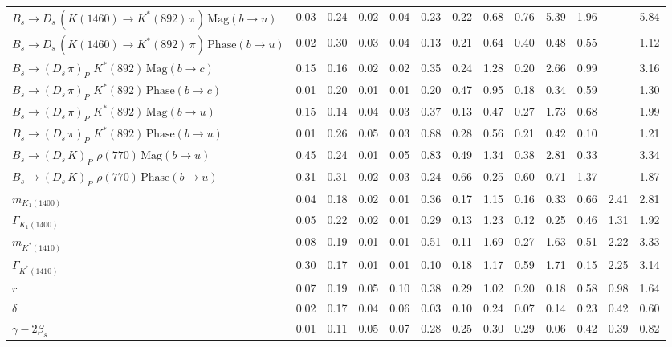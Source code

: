 \begin{tabular}{l  c  c  c  c  c  c  c  c  c  c  c  | c }
$B_s \to D_s \, ( K(1460) \to K^{*}(892) \, \pi ) \, \text{Mag} (b \to u)$ & 0.03 & 0.24 & 0.02 & 0.04 & 0.23 & 0.22 & 0.68 & 0.76 & 5.39 & 1.96 &  & 5.84 \\ 
$B_s \to D_s \, ( K(1460) \to K^{*}(892) \, \pi ) \, \text{Phase} (b \to u)$ & 0.02 & 0.30 & 0.03 & 0.04 & 0.13 & 0.21 & 0.64 & 0.40 & 0.48 & 0.55 &  & 1.12 \\ 
$B_s \to ( D_s \, \pi)_{P} \, \, K^{*}(892) \, \text{Mag} (b \to c)$ & 0.15 & 0.16 & 0.02 & 0.02 & 0.35 & 0.24 & 1.28 & 0.20 & 2.66 & 0.99 &  & 3.16 \\ 
$B_s \to ( D_s \, \pi)_{P} \, \, K^{*}(892) \, \text{Phase} (b \to c)$ & 0.01 & 0.20 & 0.01 & 0.01 & 0.20 & 0.47 & 0.95 & 0.18 & 0.34 & 0.59 &  & 1.30 \\ 
$B_s \to ( D_s \, \pi)_{P} \, \, K^{*}(892) \, \text{Mag} (b \to u)$ & 0.15 & 0.14 & 0.04 & 0.03 & 0.37 & 0.13 & 0.47 & 0.27 & 1.73 & 0.68 &  & 1.99 \\ 
$B_s \to ( D_s \, \pi)_{P} \, \, K^{*}(892) \, \text{Phase} (b \to u)$ & 0.01 & 0.26 & 0.05 & 0.03 & 0.88 & 0.28 & 0.56 & 0.21 & 0.42 & 0.10 &  & 1.21 \\ 
$B_s \to ( D_s \, K)_{P} \, \, \rho(770) \, \text{Mag} (b \to u)$ & 0.45 & 0.24 & 0.01 & 0.05 & 0.83 & 0.49 & 1.34 & 0.38 & 2.81 & 0.33 &  & 3.34 \\ 
$B_s \to ( D_s \, K)_{P} \, \, \rho(770) \, \text{Phase} (b \to u)$ & 0.31 & 0.31 & 0.02 & 0.03 & 0.24 & 0.66 & 0.25 & 0.60 & 0.71 & 1.37 &  & 1.87 \\ 
$m_{K_1(1400)} $ & 0.04 & 0.18 & 0.02 & 0.01 & 0.36 & 0.17 & 1.15 & 0.16 & 0.33 & 0.66 & 2.41 & 2.81 \\ 
$\Gamma_{K_1(1400)}$ & 0.05 & 0.22 & 0.02 & 0.01 & 0.29 & 0.13 & 1.23 & 0.12 & 0.25 & 0.46 & 1.31 & 1.92 \\ 
$m_{K^{*}(1410)}$ & 0.08 & 0.19 & 0.01 & 0.01 & 0.51 & 0.11 & 1.69 & 0.27 & 1.63 & 0.51 & 2.22 & 3.33 \\ 
$\Gamma_{K^{*}(1410)}$ & 0.30 & 0.17 & 0.01 & 0.01 & 0.10 & 0.18 & 1.17 & 0.59 & 1.71 & 0.15 & 2.25 & 3.14 \\ 
$r$ & 0.07 & 0.19 & 0.05 & 0.10 & 0.38 & 0.29 & 1.02 & 0.20 & 0.18 & 0.58 & 0.98 & 1.64 \\ 
$\delta$ & 0.02 & 0.17 & 0.04 & 0.06 & 0.03 & 0.10 & 0.24 & 0.07 & 0.14 & 0.23 & 0.42 & 0.60 \\ 
$\gamma - 2 \beta_{s}$ & 0.01 & 0.11 & 0.05 & 0.07 & 0.28 & 0.25 & 0.30 & 0.29 & 0.06 & 0.42 & 0.39 & 0.82 \\ 
\hline
\hline
\end{tabular}
